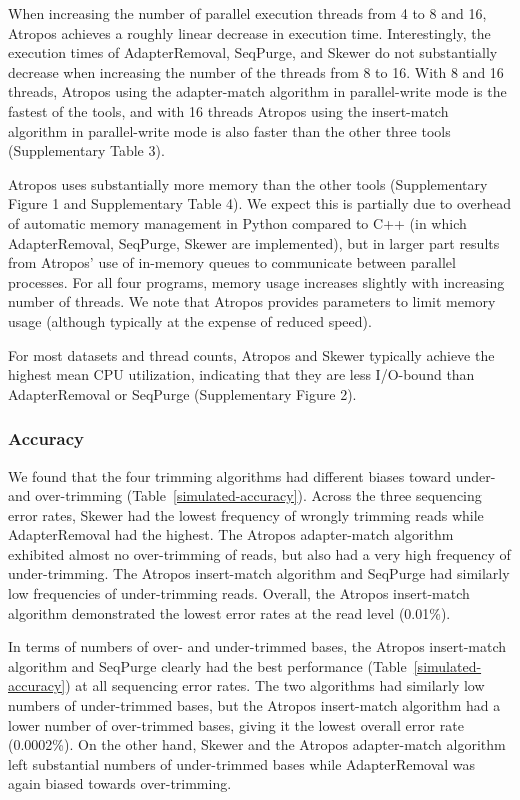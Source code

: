 \documentclass[fleqn,10pt,lineno]{wlpeerj} %
\begin{document}


When increasing the number of parallel execution threads from 4 to 8 and 16, Atropos achieves a roughly linear decrease in execution time. Interestingly, the execution times of AdapterRemoval, SeqPurge, and Skewer do not substantially decrease when increasing the number of the threads from 8 to 16. With 8 and 16 threads, Atropos using the adapter-match algorithm in parallel-write mode is the fastest of the tools, and with 16 threads Atropos using the insert-match algorithm in parallel-write mode is also faster than the other three tools (Supplementary Table 3).

Atropos uses substantially more memory than the other tools (Supplementary Figure 1 and Supplementary Table 4). We expect this is partially due to overhead of automatic memory management in Python compared to C++ (in which AdapterRemoval, SeqPurge, Skewer are implemented), but in larger part results from Atropos' use of in-memory queues to communicate between parallel processes. For all four programs, memory usage increases slightly with increasing number of threads. We note that Atropos provides parameters to limit memory usage (although typically at the expense of reduced speed).

For most datasets and thread counts, Atropos and Skewer typically achieve the highest mean CPU utilization, indicating that they are less I/O-bound than AdapterRemoval or SeqPurge (Supplementary Figure 2).

\subsubsection{Accuracy}

We found that the four trimming algorithms had different biases toward under- and over-trimming (Table~\ref{simulated-accuracy}). Across the three sequencing error rates, Skewer had the lowest frequency of wrongly trimming reads while AdapterRemoval had the highest. The Atropos adapter-match algorithm exhibited almost no over-trimming of reads, but also had a very high frequency of under-trimming. The Atropos insert-match algorithm and SeqPurge had similarly low frequencies of under-trimming reads. Overall, the Atropos insert-match algorithm demonstrated the lowest error rates at the read level (0.01\%).

In terms of numbers of over- and under-trimmed bases, the Atropos insert-match algorithm and SeqPurge clearly had the best performance (Table~\ref{simulated-accuracy}) at all sequencing error rates. The two algorithms had similarly low numbers of under-trimmed bases, but the Atropos insert-match algorithm had a lower number of over-trimmed bases, giving it the lowest overall error rate (0.0002\%). On the other hand, Skewer and the Atropos adapter-match algorithm left substantial numbers of under-trimmed bases while AdapterRemoval was again biased towards over-trimming. 
\end{document}
